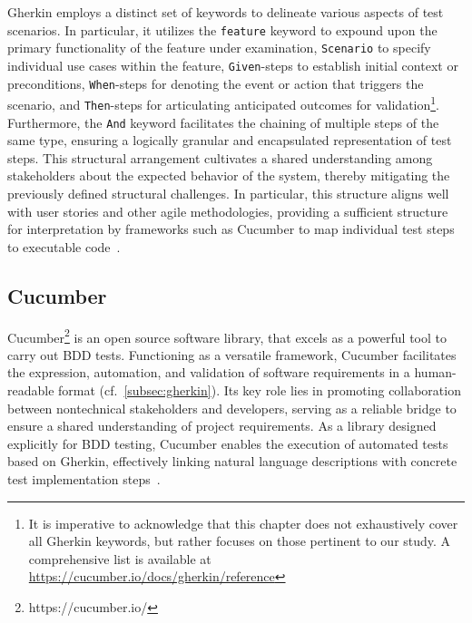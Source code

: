  Gherkin employs a distinct set of keywords to delineate various aspects of test scenarios. In particular, it utilizes the \texttt{feature} keyword to expound upon the primary functionality of the feature under examination, \texttt{Scenario} to specify individual use cases within the feature, \texttt{Given}-steps to establish initial context or preconditions, \texttt{When}-steps for denoting the event or action that triggers the scenario, and \texttt{Then}-steps for articulating anticipated outcomes for validation\footnote{It is imperative to acknowledge that this chapter does not exhaustively cover all Gherkin keywords, but rather focuses on those pertinent to our study. A comprehensive list is available at \href{https://cucumber.io/docs/gherkin/reference/\#keywords}{https://cucumber.io/docs/gherkin/reference}}. Furthermore, the \texttt{And} keyword facilitates the chaining of multiple steps of the same type, ensuring a logically granular and encapsulated representation of test steps. This structural arrangement cultivates a shared understanding among stakeholders about the expected behavior of the system, thereby mitigating the previously defined structural challenges. In particular, this structure aligns well with user stories and other agile methodologies, providing a sufficient structure for interpretation by frameworks such as Cucumber to map individual test steps to executable code~\cite{noauthor_gherkin_nodate}.


\subsection{Cucumber}
\label{subsec:cucumber}
Cucumber\footnote{https://cucumber.io/} is an open source software library, that excels as a powerful tool to carry out \ac{BDD} tests. Functioning as a versatile framework, Cucumber facilitates the expression, automation, and validation of software requirements in a human-readable format (cf.~\cref{subsec:gherkin}). Its key role lies in promoting collaboration between nontechnical stakeholders and developers, serving as a reliable bridge to ensure a shared understanding of project requirements. As a library designed explicitly for BDD testing, Cucumber enables the execution of automated tests based on Gherkin, effectively linking natural language descriptions with concrete test implementation steps~\cite{wynne2012cucumber}.

